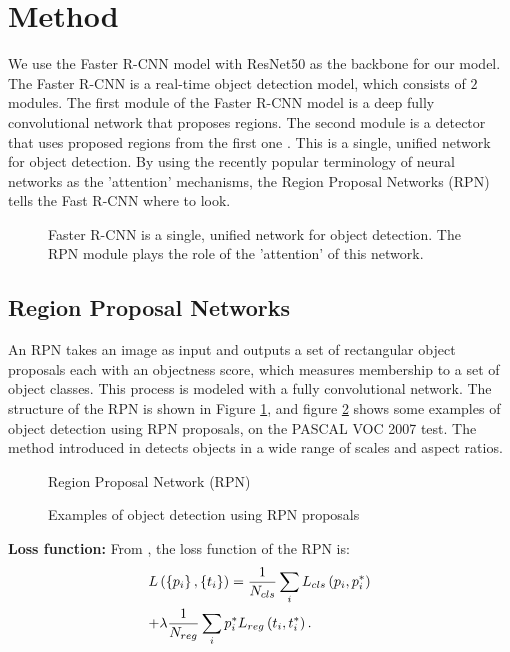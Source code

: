 \section{Method}
We use the Faster R-CNN model with ResNet50 as the backbone for our model. The Faster R-CNN is a real-time object detection model, which consists of $2$ modules. The first module of the Faster R-CNN model is a deep fully convolutional network that proposes regions. The second module is a detector that uses proposed regions from the first one \cite{f-rcnn}. This is a single, unified network for object detection. By using the recently popular terminology of neural networks as the 'attention' mechanisms, the Region Proposal Networks (RPN) tells the Fast R-CNN where to look.

\begin{figure}[H]
\caption{Faster R-CNN is a single, unified network for object detection. The RPN module plays the role of the 'attention' of this network.}
\end{figure}

\subsection{Region Proposal Networks}
An RPN takes an image as input and outputs a set of rectangular object proposals each with an objectness score, which measures membership to a set of object classes. This process is modeled with a fully convolutional network. The structure of the RPN is shown in Figure \ref{rpn}, and figure \ref{rpn_example} shows some examples of object detection using RPN proposals, on the PASCAL VOC 2007 test. The method introduced in  \cite{f-rcnn} detects objects in a wide range of scales and aspect ratios.

\begin{figure}[H]
\caption{Region Proposal Network (RPN)}
\label{rpn}
\end{figure}

\begin{figure}[H]
\caption{Examples of object detection using RPN proposals}
\label{rpn_example}
\end{figure}

\textbf{Loss function:} From \cite{f-rcnn}, the loss function of the RPN is:
$$\begin{gathered}
 L\left( {\left\{ {{p_i}} \right\},\left\{ {{t_i}} \right\}} \right) = \frac{1}{{{N_{cls}}}}\sum\limits_i {{L_{cls}}\left( {{p_i},p_i^*} \right)}  \hfill \\
  + \lambda \frac{1}{{{N_{reg}}}}\sum\limits_i {p_i^*} {L_{reg}}\left( {{t_i},t_i^*} \right). \hfill \\
\end{gathered} $$

